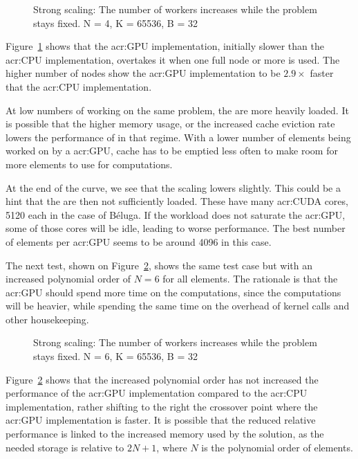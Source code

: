 \begin{figure}[H]
	\centering
	
	\caption{Strong scaling: The number of workers increases while the problem stays fixed. N = 4, K = 65536, B = 32}\label{fig:strong_scaling_N4_W32}
\end{figure}

Figure~\ref{fig:strong_scaling_N4_W32} shows that the \acrshort{acr:GPU} implementation, initially
slower than the \acrshort{acr:CPU} implementation, overtakes it when one full node or more is used.
The higher number of nodes show the \acrshort{acr:GPU} implementation to be \(2.9 \times \) faster
that the \acrshort{acr:CPU} implementation.

At low numbers of  working on the same problem, the  are
more heavily loaded. It is possible that the higher memory usage, or the increased cache eviction
rate lowers the performance of  in that regime. With a lower number of elements
being worked on by a \acrshort{acr:GPU}, cache has to be emptied less often to make room for more
elements to use for computations.

At the end of the curve, we see that the scaling lowers slightly. This could be a hint that the
 are then not sufficiently loaded. These  have many
\acrshort{acr:CUDA} cores, 5120 each in the case of Béluga. If the workload does not saturate the
\acrshort{acr:GPU}, some of those cores will be idle, leading to worse performance. The best number
of elements per \acrshort{acr:GPU} seems to be around 4096 in this case.

The next test, shown on Figure~\ref{fig:strong_scaling_N6_W32}, shows the same test case but with an
increased polynomial order of \(N = 6\) for all elements. The rationale is that the
\acrshort{acr:GPU} should spend more time on the computations, since the computations will be
heavier, while spending the same time on the overhead of kernel calls and other housekeeping.

\begin{figure}[H]
	\centering
	
	\caption{Strong scaling: The number of workers increases while the problem stays fixed. N = 6, K = 65536, B = 32}\label{fig:strong_scaling_N6_W32}
\end{figure}

Figure~\ref{fig:strong_scaling_N6_W32} shows that the increased polynomial order has not increased
the performance of the \acrshort{acr:GPU} implementation compared to the \acrshort{acr:CPU}
implementation, rather shifting to the right the crossover point where the \acrshort{acr:GPU}
implementation is faster. It is possible that the reduced relative performance is linked to the
increased memory used by the solution, as the needed storage is relative to \(2 N + 1\), where \(N\)
is the polynomial order of elements.

